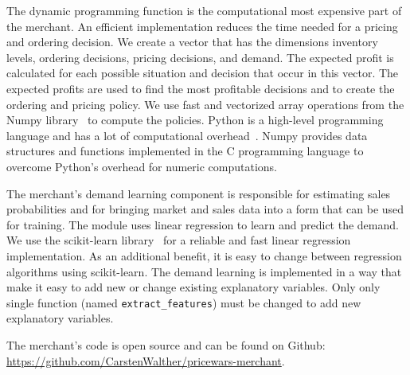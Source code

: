 The dynamic programming function is the computational most expensive part of the merchant.
An efficient implementation reduces the time needed for a pricing and ordering decision.
We create a vector that has the dimensions inventory levels, ordering decisions, pricing decisions, and demand.
The expected profit is calculated for each possible situation and decision that occur in this vector.
The expected profits are used to find the most profitable decisions and to create the ordering and pricing policy.
We use fast and vectorized array operations from the Numpy library~\cite{dubois1996numerical} to compute the policies.
Python is a high-level programming language and has a lot of computational overhead~\cite{DBLP:journals/cse/BehnelBCDSS11}.
Numpy provides data structures and functions implemented in the C programming language to overcome Python's overhead for numeric computations.

The merchant's demand learning component is responsible for estimating sales probabilities and for bringing market and sales data into a form that can be used for training.
The module uses linear regression to learn and predict the demand.
We use the scikit-learn library~\cite{DBLP:journals/jmlr/PedregosaVGMTGBPWDVPCBPD11} for a reliable and fast linear regression implementation.
As an additional benefit, it is easy to change between regression algorithms using scikit-learn.
The demand learning is implemented in a way that make it easy to add new or change existing explanatory variables.
Only only single function (named \texttt{extract\_features}) must be changed to add new explanatory variables.


The merchant's code is open source and can be found on Github: \url{https://github.com/CarstenWalther/pricewars-merchant}.

